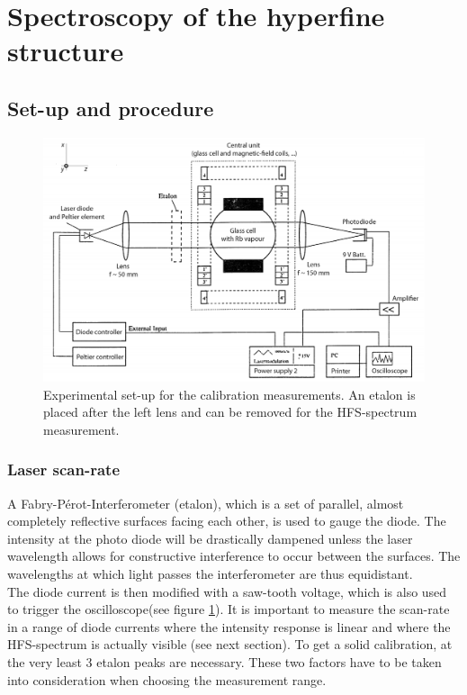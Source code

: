 \section{Spectroscopy of the hyperfine structure}
\subsection{Set-up and procedure}
\begin{figure}[htb]
	\includegraphics[width=1.0\linewidth]{graphics/calibrationsetup}
	\caption[Experimental set-up for the Calibration]{Experimental set-up for the calibration measurements. An etalon is placed after the left lens and can be removed for the HFS-spectrum measurement.\cite{anleitung}}
	\label{fig:calibration setup}
\end{figure}
\subsubsection*{Laser scan-rate}
A Fabry-Pérot-Interferometer (etalon), which is a set of parallel, almost completely reflective surfaces facing each other, is used to gauge the diode. The intensity at the photo diode will be drastically dampened unless the laser wavelength allows for constructive interference to occur between the surfaces. The wavelengths at which light passes the interferometer are thus equidistant.\\

The diode current is then modified with a saw-tooth voltage, which is also used to trigger the oscilloscope(see figure \ref{fig:calibration setup}). It is important to measure the scan-rate in a range of diode currents where the intensity response is linear and where the HFS-spectrum is actually visible (see next section). To get a solid calibration, at the very least 3 etalon peaks are necessary. These two factors have to be taken into consideration when choosing the measurement range.\\ 

